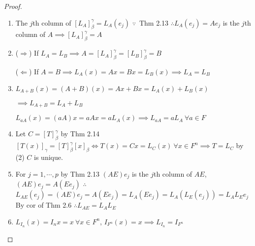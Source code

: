 \begin{proof}
	\begin{enumerate}
\item The $j$th column of $[L_A]_{\beta}^{\gamma} = L_A(e_j) $ $\because $\ Thm 2.13 %
	$\therefore L_A(e_j) = Ae_j$ is the $j$th column of $A \implies [L_A]_{\beta}^{\gamma} = A$
\item ($\Rightarrow$) If $L_A = L_B \implies A = [L_A]_{\beta}^{\gamma} = [L_B]_{\beta}^{\gamma} = B$ 
	
	($\Leftarrow$) If $A = B \implies L_A(x) = Ax = Bx = L_{B}(x)\implies L_{A} = L_{B}$	
\item $L_{A+B}(x) = (A + B)(x) = Ax + Bx  = L_A(x) + L_B(x)$ 

	$\implies L_{A+B} = L_A + L_B$
	
	$L_{aA}(x) = (aA)x = aAx = aL_{A}(x)\implies L_{aA} = aL_{A}\ \forall a \in F$
	

\item Let $C = [T]_{\beta}^{\gamma}$ by Thm 2.14 $[T(x)]_{\gamma} = [T]_{\beta}^{\gamma}[x]_{\beta} \Leftrightarrow T(x) = Cx = L_{C}(x)\ \forall x \in F^{n} \implies T = L_{C}$ by (2) $C$ is unique.
\item For $j = 1,\cdots ,p$ by Thm 2.13 $(AE)e_j$ is the  $j$th column of $AE$, $(AE)e_j = A(Ee_j)$ $\therefore$ $L_{AE}(e_j) = (AE)e_j = A(Ee_j) = L_A(Ee_j) = L_A(L_E(e_j)) = L_AL_Ee_j$ By cor of Thm 2.6 $\therefore L_{AE} = L_AL_E$
\item $L_{I_n}(x) = I_nx = x\ \forall x\in F^{n}$, $I_{F^{n}}(x) = x \implies L_{I_n} = I_{F^n}$ 



\end{enumerate} 
\end{proof}

